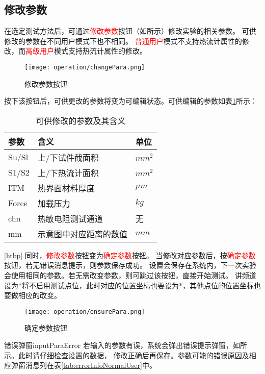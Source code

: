 \subsection{修改参数}
在选定测试方法后，可通过\textcolor{red}{修改参数}按钮（如所示）修改实验的相关参数。
可供修改的参数在不同用户模式下也不相同。
\textcolor{red}{普通用户}模式不支持热流计属性的修改，而\textcolor{red}{高级用户}模式支持热流计属性的修改。
\begin{figure}[H]
    \centering
    \texttt{[image: operation/changePara.png]}
    \caption{ 修改参数按钮 \label{fig:btnChangePara}}
\end{figure}
按下该按钮后，可供更改的参数将变为可编辑状态。可供编辑的参数如表\ref{tab:editableParaNormalUser}所示：
\begin{table}
    \centering
    \caption{ 可供修改的参数及其含义 \label{tab:editableParaNormalUser}}
    \begin{tabular}{@{}lll@{}}
        \toprule
        参数  & 含义                   & 单位    \\ \midrule
        Su/Sl & 上/下试件截面积        & $mm^2$  \\
        S1/S2 & 上/下热流计面积        & $mm^2$  \\
        ITM   & 热界面材料厚度         & $\mu m$ \\
        Force & 加载压力               & $kg$    \\
        chn   & 热敏电阻测试通道       & 无      \\
        mm    & 示意图中对应距离的数值 & $mm$    \\ \bottomrule
    \end{tabular}
\end{table}[htbp]
同时，\textcolor{red}{修改参数}按钮变为\textcolor{red}{确定参数}按钮。
当修改对应参数后，按\textcolor{red}{确定参数}按钮，若无错误消息提示，则参数保存成功。
设置会保存在系统内，下一次实验会使用相同的参数。若无需改变参数，则可跳过该按钮，直接开始测试。
讲频道设为*将不启用测试点位，此时对应的位置坐标也要设为*，其他点位的位置坐标也要做相应的改变。
\begin{figure}[H]
    \centering
    \texttt{[image: operation/ensurePara.png]}
    \caption{ 确定参数按钮 \label{fig:ensurePara}}
\end{figure}

\begin{tips}{错误弹窗}{inputParaError}
    若输入的参数有误，系统会弹出错误提示弹窗，如所示。此时请仔细检查设置的数据，
    修改正确后再保存。参数可能的错误原因及相应弹窗消息列在表\ref{tab:errorInfoNormalUser}中。
\end{tips}

